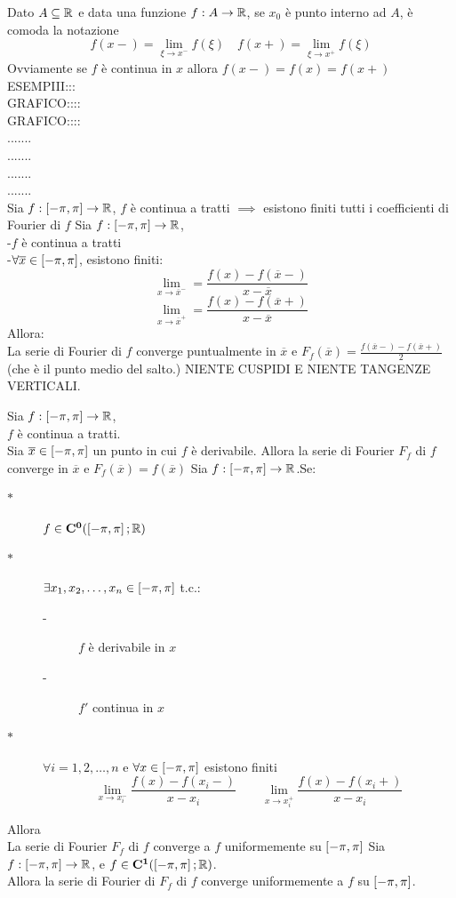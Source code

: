 \observation
Dato $A\subseteq \mathbb{R}$ e data una funzione $f:A \to \mathbb{R}$, se $x_0$ è punto interno ad $A$, è comoda la notazione
\[f(x-)=\lim\limits_{\xi\to x^{-}}f(\xi)\quad f(x+)=\lim\limits_{\xi\to x^{+}}f(\xi)\]
Ovviamente se $f$ è continua in $x$ allora $f(x-)=f(x)=f(x+)$
ESEMPIII:::\\
GRAFICO::::\\
GRAFICO::::\\
.......\\
.......\\
.......\\
.......\\
\proposition
Sia $f: \left[-\pi,\pi\right] \to \mathbb{R}$, $f$ è continua a tratti $\implies$ esistono finiti tutti i coefficienti di Fourier di $f$
\proposition
Sia $f: \left[-\pi,\pi\right] \to \mathbb{R}$,\\
-$f$ è continua a tratti\\
-$\forall \overline{x} \in\left[-\pi,\pi\right]$, esistono finiti:\\
\[ \lim\limits_{x\to\overline{x}^{-}}=\frac{f(x)-f(\overline{x}-)}{x-\overline{x}} \]
\[ \lim\limits_{x\to\overline{x}^{+}}=\frac{f(x)-f(\overline{x}+)}{x-\overline{x}} \]
Allora:\\
La serie di Fourier di $f$ converge puntualmente in $\overline{x}$ e $F_f(\overline{x})=\frac{f(\overline{x}-)-f(\overline{x}+)}{2}$ (che è il punto medio del salto.)
\observation NIENTE CUSPIDI E NIENTE TANGENZE VERTICALI.

\corollary
Sia $f: \left[-\pi,\pi\right] \to \mathbb{R}$,\\
$f$ è continua a tratti.\\
Sia $\overline{x}\in\left[-\pi,\pi\right]$ un punto in cui $f$ è derivabile. Allora la serie di Fourier $F_f$ di $f$ converge in $\overline{x}$ e $F_f(\overline{x})=f(\overline{x})$
\proposition
Sia $f: \left[-\pi,\pi\right] \to \mathbb{R}$.Se:\\
\begin{description}
	\item[$\ast$] $f\in \mathbf{C^{0}}(\left[-\pi,\pi\right]; \mathbb{R})$
	\item[$\ast$] $\exists x_1,x_2,\dotsc,x_n\in\left[-\pi,\pi\right]$ t.c.:
	\begin{description}
		\item[-] $f$ è derivabile in $x$
		\item[-] $f'$ continua in $x$
	\end{description}
	\item[$\ast$] $\forall i=1,2,\dotsc,n$ e $\forall x\in\left[-\pi,\pi\right]$ esistono finiti
	\[\lim\limits_{x\to x_i^{-}}\frac{f(x)-f(x_i-)}{x-x_i}\qquad \lim\limits_{x\to x_i^{+}}\frac{f(x)-f(x_i+)}{x-x_i}\]

\end{description}
Allora\\
La serie di Fourier $F_f$ di $f$ converge a $f$ uniformemente su $\left[-\pi,\pi\right]$
\corollary
Sia $f: \left[-\pi,\pi\right] \to \mathbb{R}$, e $f\in \mathbf{C^{1}}(\left[-\pi,\pi\right]; \mathbb{R})$.\\
Allora la serie di Fourier di $F_f$ di $f$ converge uniformemente a $f$ su $\left[-\pi,\pi\right]$.
